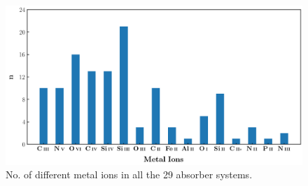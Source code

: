 \begin{figure}
    \centering
    \includegraphics[width=\linewidth]{Figures/metal-ions.png}
    \caption{No. of different metal ions in all the 29 absorber systems.}
    \label{fig:metal-ions-hist}
\end{figure}


